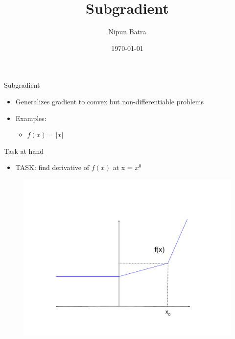 \documentclass{beamer}
\title{Subgradient}
\date{\today}
\author{Nipun Batra}
\institute{IIT Gandhinagar}
\begin{document}
  \maketitle
  
  
  

\begin{frame}{Subgradient }
\begin{itemize}
	
	
	\item Generalizes gradient to convex but non-differentiable problems
	\item Examples:
	\begin{itemize}
		\item $f(x) = |x|$
	\end{itemize}
	
\end{itemize}
\end{frame}

\begin{frame}{Task at hand}
\begin{itemize}

\item TASK: find derivative of $f(x)$ at x = $x^0$
\end{itemize}
\begin{figure}
    \centering
    \includegraphics[scale = 0.25]{subgradient_1.pdf}
    
    \label{fig:Non-differentiable function}
\end{figure}
	

\end{frame}
\end{document}

